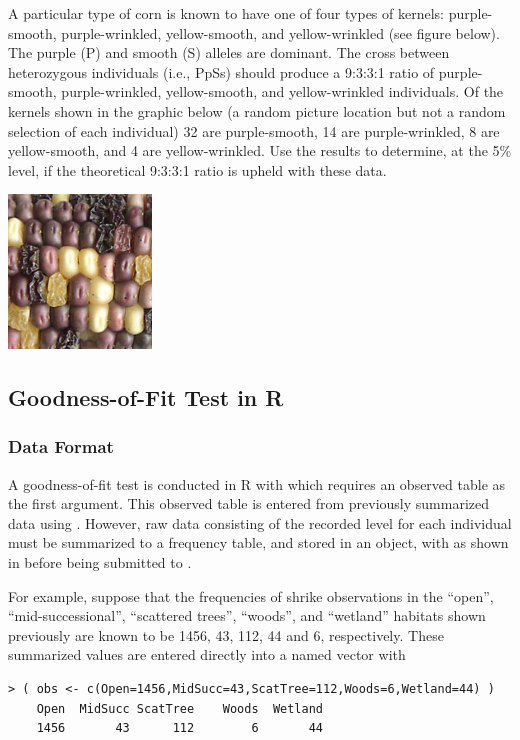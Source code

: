 \documentclass[10pt,openany]{book}\usepackage[]{graphicx}\usepackage[]{color}
\makeatletter
\newenvironment{kframe}{%
 \def\at@end@of@kframe{}%
 \ifinner\ifhmode%
  \def\at@end@of@kframe{\end{minipage}}%
  \begin{minipage}{\columnwidth}%
 \fi\fi%
 \def\FrameCommand##1{\hskip\@totalleftmargin \hskip-\fboxsep
 \colorbox{shadecolor}{##1}\hskip-\fboxsep
     \hskip-\linewidth \hskip-\@totalleftmargin \hskip\columnwidth}%
 \MakeFramed {\advance\hsize-\width
   \@totalleftmargin\z@ \linewidth\hsize
   \@setminipage}}%
 {\par\unskip\endMakeFramed%
 \at@end@of@kframe}
\newenvironment{knitrout}{}{} %
\makeatother
\begin{document}
\begin{exsection}
  \item \label{revex:ChiGOFMendels1} A particular type of corn is known to have one of four types of kernels: purple-smooth, purple-wrinkled, yellow-smooth, and yellow-wrinkled (see figure below).  The purple (P) and smooth (S) alleles are dominant.  The cross between heterozygous individuals (i.e., PpSs) should produce a 9:3:3:1 ratio of purple-smooth, purple-wrinkled, yellow-smooth, and yellow-wrinkled individuals.  Of the kernels shown in the graphic below (a random picture location but not a random selection of each individual) 32 are purple-smooth, 14 are purple-wrinkled, 8 are yellow-smooth, and 4 are yellow-wrinkled.  Use the results to determine, at the 5\% level, if the theoretical 9:3:3:1 ratio is upheld with these data. 
    \begin{center}
      \includegraphics[width=1.5in]{Figs/ChiGOF_corn.jpg}
    \end{center}
\end{exsection}

\subsection{Goodness-of-Fit Test in R}
\subsubsection{Data Format}
A goodness-of-fit test is conducted in R with  which requires an observed table as the first argument.  This observed table is entered from previously summarized data using .  However, raw data consisting of the recorded level for each individual must be summarized to a frequency table, and stored in an object, with  as shown in  before being submitted to .

For example, suppose that the frequencies of shrike observations in the ``open'', ``mid-successional'', ``scattered trees'', ``woods'', and ``wetland'' habitats shown previously are known to be 1456, 43, 112, 44 and 6, respectively.  These summarized values are entered directly into a named vector with
\begin{knitrout}
\color{fgcolor}\begin{kframe}
\begin{verbatim}
> ( obs <- c(Open=1456,MidSucc=43,ScatTree=112,Woods=6,Wetland=44) )
    Open  MidSucc ScatTree    Woods  Wetland 
    1456       43      112        6       44 
\end{verbatim}
\end{kframe}
\end{knitrout}
\end{document}
